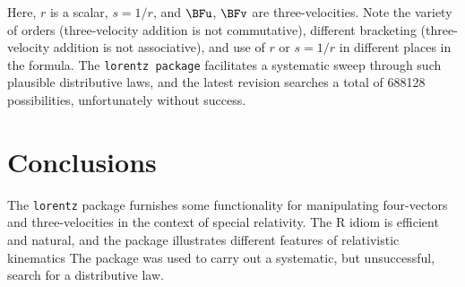 \documentclass[ijoc,nonblindrev]{informs3} %
\begin{document}
Here, $r$ is a scalar, $s=1/r$, and $\BFu$, $\BFv$ are three-velocities.
Note the variety of orders (three-velocity addition is not
commutative), different bracketing (three-velocity addition is not
associative), and use of $r$ or $s=1/r$ in different places in the
formula.  The {\tt lorentz package} facilitates a systematic sweep
through such plausible distributive laws, and the latest revision
searches a total of 688128 possibilities, unfortunately without
success.

\section{Conclusions}

The {\tt lorentz} package furnishes some functionality for
manipulating four-vectors and three-velocities in the context of
special relativity.  The R idiom is efficient and natural, and the
package illustrates different features of relativistic kinematics 
The package was used to carry out a systematic, but unsuccessful,
search for a distributive law.


%
%
%




\end{document}
